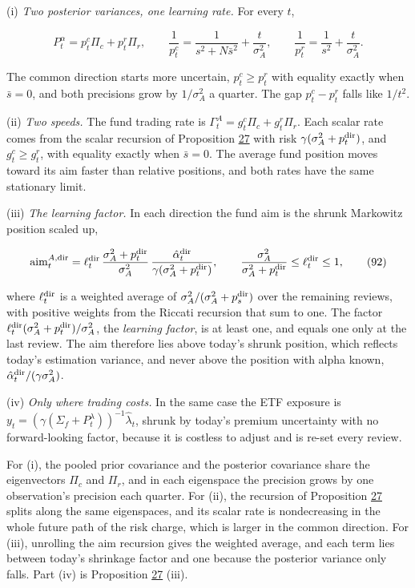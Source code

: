 \documentclass[11pt]{article}
\begin{document}
(i) \emph{Two posterior variances, one learning rate.} For every \(t\),

\begin{equation*}
P^\alpha_t=p^c_t\Pi_c+p^r_t\Pi_r,\qquad
\frac1{p^c_t}=\frac1{s^2+N\bar s^2}+\frac t{\sigma_A^2},\qquad
\frac1{p^r_t}=\frac1{s^2}+\frac t{\sigma_A^2}.\tag{91}\label{eq:91}
\end{equation*}

The common direction starts more uncertain, \(p^c_t\geq p^r_t\) with
equality exactly when \(\bar s=0\), and both precisions grow by
\(1/\sigma_A^2\) a quarter. The gap \(p^c_t-p^r_t\) falls like \(1/t^2\).

(ii) \emph{Two speeds.} The fund trading rate is
\(\Gamma^A_t=g^c_t\Pi_c+g^r_t\Pi_r\). Each scalar rate comes from the scalar
recursion of Proposition \hyperref[res:Proposition-27]{27} with risk \(\gamma(\sigma_A^2+p^{\rm dir}_t)\), and
\(g^c_t\geq g^r_t\), with equality exactly when \(\bar s=0\). The average fund
position moves toward its aim faster than relative positions, and
both rates have the same stationary limit.

(iii) \emph{The learning factor.} In each direction the fund aim is the
shrunk Markowitz position scaled up,

\begin{equation*}
\mathrm{aim}^{A,\rm dir}_t=\ell^{\rm dir}_t\,
\frac{\sigma_A^2+p^{\rm dir}_t}{\sigma_A^2}\,
\frac{\hat\alpha^{\rm dir}_t}{\gamma(\sigma_A^2+p^{\rm dir}_t)},\qquad
\frac{\sigma_A^2}{\sigma_A^2+p^{\rm dir}_t}\leq\ell^{\rm dir}_t\leq1,\tag{92}\label{eq:92}
\end{equation*}

where \(\ell^{\rm dir}_t\) is a weighted average of
\(\sigma_A^2/(\sigma_A^2+p^{\rm dir}_s)\) over the remaining reviews, with positive
weights from the Riccati recursion that sum to one. The factor
\(\ell^{\rm dir}_t(\sigma_A^2+p^{\rm dir}_t)/\sigma_A^2\), the \emph{learning factor}, is at
least one, and equals one only at the last review. The aim therefore
lies above today's shrunk position, which reflects today's
estimation variance, and never above the position with alpha known,
\(\hat\alpha^{\rm dir}_t/(\gamma\sigma_A^2)\).

(iv) \emph{Only where trading costs.} In the same case the ETF exposure is
\(y_t=(\gamma(\Sigma_f+P^\lambda_t))^{-1}\hat\lambda_t\), shrunk by today's
premium uncertainty with no forward-looking factor, because it is
costless to adjust and is re-set every review.

For (i), the pooled prior covariance and the posterior covariance
share the eigenvectors \(\Pi_c\) and \(\Pi_r\), and in each eigenspace the
precision grows by one observation's precision each quarter. For
(ii), the recursion of Proposition \hyperref[res:Proposition-27]{27} splits along the same
eigenspaces, and its scalar rate is nondecreasing in the whole future
path of the risk charge, which is larger in the common direction.
For (iii), unrolling the aim recursion gives the weighted average,
and each term lies between today's shrinkage factor and one because
the posterior variance only falls. Part (iv) is Proposition \hyperref[res:Proposition-27]{27} (iii).
\end{document}
